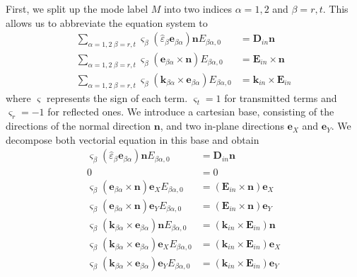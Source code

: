 \documentclass[12pt,a4paper,twoside,openright,BCOR10mm,headsepline,titlepage,abstracton,chapterprefix,final]{scrreprt}
\newcommand\Vector[1]{{\mathbf{#1}}}
\newcommand\wavenumber{k}
\newcommand\Wavevector{\Vector{\wavenumber}}
\newcommand\Tensor[1]{\hat{#1}}
\newcommand\scalarEfield{E}
\newcommand\scalarDfield{D}
\newcommand\Efield{\Vector{\scalarEfield}}
\newcommand\Dfield{\Vector{\scalarDfield}}
\newcommand\permittivity{\Tensor{\scalarpermittivity}}
\newcommand\scalarpermittivity{\varepsilon}
\begin{document}
First, we split up the mode label $M$ into two indices $\alpha=1,2$ and $\beta=r,t$.
This allows us to abbreviate the equation system to
\begin{subequations}
  \begin{align}
    \sum_{\alpha=1,2\;\beta=r,t} \varsigma_\beta (\permittivity_\beta \Vector{e}_{\beta\alpha})\Vector{n} E_{\beta\alpha,0} &= \Dfield_{in} \Vector{n}                   \label{eq:FresnelSystemEq1} \\
    \sum_{\alpha=1,2\;\beta=r,t} \varsigma_\beta (\Vector{e}_{\beta\alpha} \times \Vector{n} ) E_{\beta\alpha,0} &= \Efield_{in} \times \Vector{n}                        \label{eq:FresnelSystemEq2} \\
    \sum_{\alpha=1,2\;\beta=r,t} \varsigma_\beta ( \Wavevector_{\beta\alpha} \times \Vector{e}_{\beta\alpha} ) E_{\beta\alpha,0} &=  \Wavevector_{in} \times \Efield_{in} \label{eq:FresnelSystemEq3}
  \end{align}
\end{subequations}
where $\varsigma$ represents the sign of each term.
$\varsigma_t=1$ for transmitted terms and $\varsigma_r=-1$ for reflected ones.
We introduce a cartesian base, 
consisting of the directions of the normal direction $\Vector{n}$, 
and two in-plane directions $\Vector{e}_X$ and $\Vector{e}_Y$.
We decompose both vectorial equation in this base and obtain
\begin{subequations}
  \begin{align}
    \varsigma_\beta (\permittivity_\beta \Vector{e}_{\beta\alpha})\Vector{n} E_{\beta\alpha,0} &= \Dfield_{in} \Vector{n} \\
    0 &= 0 \\
    \varsigma_\beta (\Vector{e}_{\beta\alpha} \times \Vector{n} ) \Vector{e}_X E_{\beta\alpha,0} &= (\Efield_{in} \times \Vector{n}) \Vector{e}_X \\
    \varsigma_\beta (\Vector{e}_{\beta\alpha} \times \Vector{n} ) \Vector{e}_Y E_{\beta\alpha,0} &= (\Efield_{in} \times \Vector{n}) \Vector{e}_Y \\
    \varsigma_\beta ( \Wavevector_{\beta\alpha} \times \Vector{e}_{\beta\alpha} ) \Vector{n} E_{\beta\alpha,0} &= (\Wavevector_{in} \times \Efield_{in})\Vector{n} \label{eq:fresnelTripleProductSubEq}\\
    \varsigma_\beta ( \Wavevector_{\beta\alpha} \times \Vector{e}_{\beta\alpha} ) \Vector{e}_X E_{\beta\alpha,0} &= (\Wavevector_{in} \times \Efield_{in}) \Vector{e}_X \\
    \varsigma_\beta ( \Wavevector_{\beta\alpha} \times \Vector{e}_{\beta\alpha} ) \Vector{e}_Y E_{\beta\alpha,0} &= (\Wavevector_{in} \times \Efield_{in}) \Vector{e}_Y
  \end{align}
\end{subequations}
\end{document}
